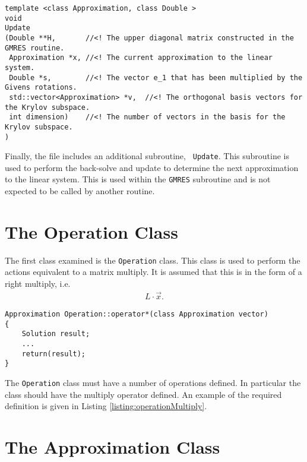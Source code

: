 \begin{lstlisting}[caption={The definition for the Update routine.},
                   basicstyle=\scriptsize,
                   label=listing:updateDefinition]
template <class Approximation, class Double >
void 
Update
(Double **H,       //<! The upper diagonal matrix constructed in the GMRES routine.
 Approximation *x, //<! The current approximation to the linear system.
 Double *s,        //<! The vector e_1 that has been multiplied by the Givens rotations.
 std::vector<Approximation> *v,  //<! The orthogonal basis vectors for the Krylov subspace.
 int dimension)    //<! The number of vectors in the basis for the Krylov subspace.
)
\end{lstlisting}

Finally, the file includes an additional subroutine, {\tt
  Update}. This subroutine is used to perform the back-solve and
update to determine the next approximation to the linear system. This
is used within the {\tt GMRES} subroutine and is not expected to be
called by another routine.


\section{The Operation Class}

The first class examined is the {\tt Operation} class. This class is
used to perform the actions equivalent to a matrix multiply. It is
assumed that this is in the form of a right multiply, i.e.
\begin{eqnarray*}
  L \cdot \vec{x}.
\end{eqnarray*}

\begin{lstlisting}[caption={An example of the multiply operation
    defined for the Operation class.},
                   basicstyle=\scriptsize,
                   label=listing:operationMultiply]
Approximation Operation::operator*(class Approximation vector)
{
  	Solution result;
    ...
    return(result);
}
\end{lstlisting}

The {\tt Operation} class must have a number of operations defined. In
particular the class should have the multiply operator defined. An
example of the required definition is given in Listing
\ref{listing:operationMultiply}.



\section{The Approximation Class}

